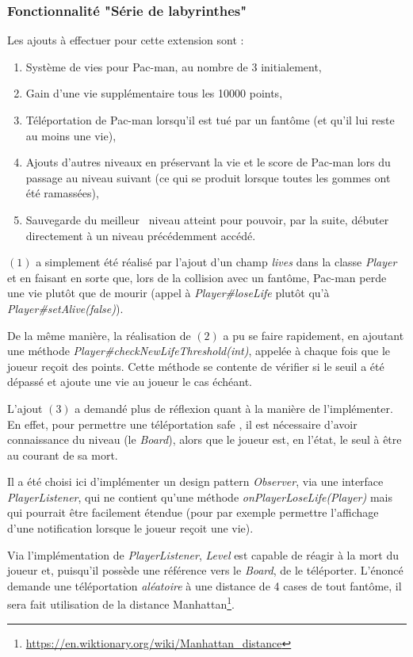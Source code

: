 \documentclass[12pt, openany]{report}
\begin{document}
\subsubsection{Fonctionnalité "Série de labyrinthes"}
Les ajouts à effectuer pour cette extension sont :
\begin{enumerate}
	\item Système de vies pour Pac-man, au nombre de 3 initialement,
	\item Gain d'une vie supplémentaire tous les 10000 points,
	\item Téléportation de Pac-man lorsqu'il est tué par un fantôme (et qu'il lui reste au moins une vie),
	\item Ajouts d'autres niveaux en préservant la vie et le score de Pac-man lors du passage au niveau suivant (ce qui se produit lorsque toutes les gommes ont été ramassées),
	\item Sauvegarde du \og meilleur \fg \, niveau atteint pour pouvoir, par la suite, débuter directement à un niveau précédemment accédé.
\end{enumerate} 

$(1)$ a simplement été réalisé par l'ajout d'un champ \mbox{\textit{lives}} dans la classe \mbox{\textit{Player}} et en faisant en sorte que, lors de la collision avec un fantôme, Pac-man perde une vie plutôt que de mourir (appel à \mbox{\textit{Player\#loseLife}} plutôt qu'à \mbox{\textit{Player\#setAlive(false)}}).

De la même manière, la réalisation de $(2)$ a pu se faire rapidement, en ajoutant une méthode \mbox{\textit{Player\#checkNewLifeThreshold(int)}}, appelée à chaque fois que le joueur reçoit des points. Cette méthode se contente de vérifier si le seuil a été dépassé et ajoute une vie au joueur le cas échéant.

L'ajout $(3)$ a demandé plus de réflexion quant à la manière de l'implémenter. En effet, pour permettre une téléportation \og safe \fg , il est nécessaire d'avoir connaissance du niveau (le \mbox{\textit{Board}}), alors que le joueur est, en l'état, le seul à être au courant de sa mort.

Il a été choisi ici d'implémenter un design pattern \mbox{\textit{Observer}}, via une interface \mbox{\textit{PlayerListener}}, qui ne contient qu'une méthode \mbox{\textit{onPlayerLoseLife(Player)}} mais qui pourrait être facilement étendue (pour par exemple permettre l'affichage d'une notification lorsque le joueur reçoit une vie).

Via l'implémentation de \mbox{\textit{PlayerListener}}, \mbox{\textit{Level}} est capable de réagir à la mort du joueur et, puisqu'il possède une référence vers le \mbox{\textit{Board}}, de le téléporter. L'énoncé demande une téléportation \textit{aléatoire} à une distance de 4 cases de tout fantôme, il sera fait utilisation de la distance Manhattan\footnote{\url{https://en.wiktionary.org/wiki/Manhattan_distance}}.
\end{document}
